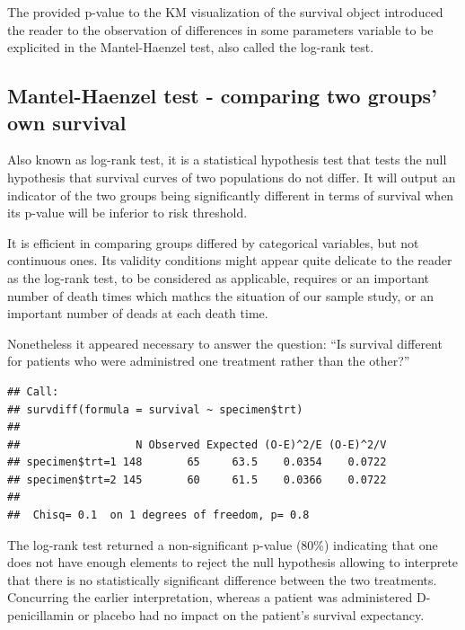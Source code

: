 \documentclass[]{article}
\newenvironment{Shaded}{\begin{snugshade}}{\end{snugshade}}
\newcommand{\KeywordTok}[1]{\textcolor[rgb]{0.13,0.29,0.53}{\textbf{#1}}}
\newcommand{\StringTok}[1]{\textcolor[rgb]{0.31,0.60,0.02}{#1}}
\newcommand{\OperatorTok}[1]{\textcolor[rgb]{0.81,0.36,0.00}{\textbf{#1}}}
\newcommand{\NormalTok}[1]{#1}
\begin{document}
The provided p-value to the KM visualization of the survival object
introduced the reader to the observation of differences in some
parameters variable to be explicited in the Mantel-Haenzel test, also
called the log-rank test.

\subsection{Mantel-Haenzel test - comparing two groups' own
survival}\label{mantel-haenzel-test---comparing-two-groups-own-survival}

Also known as log-rank test, it is a statistical hypothesis test that
tests the null hypothesis that survival curves of two populations do not
differ. It will output an indicator of the two groups being
significantly different in terms of survival when its p-value will be
inferior to risk threshold.

It is efficient in comparing groups differed by categorical variables,
but not continuous ones. Its validity conditions might appear quite
delicate to the reader as the log-rank test, to be considered as
applicable, requires or an important number of death times which mathcs
the situation of our sample study, or an important number of deads at
each death time.

Nonetheless it appeared necessary to answer the question: ``Is survival
different for patients who were administred one treatment rather than
the other?''

\begin{Shaded}
\end{Shaded}

\begin{verbatim}
## Call:
## survdiff(formula = survival ~ specimen$trt)
## 
##                  N Observed Expected (O-E)^2/E (O-E)^2/V
## specimen$trt=1 148       65     63.5    0.0354    0.0722
## specimen$trt=2 145       60     61.5    0.0366    0.0722
## 
##  Chisq= 0.1  on 1 degrees of freedom, p= 0.8
\end{verbatim}

The log-rank test returned a non-significant p-value (80\%) indicating
that one does not have enough elements to reject the null hypothesis
allowing to interprete that there is no statistically significant
difference between the two treatments. Concurring the earlier
interpretation, whereas a patient was administered D-penicillamin or
placebo had no impact on the patient's survival expectancy.
\end{document}
